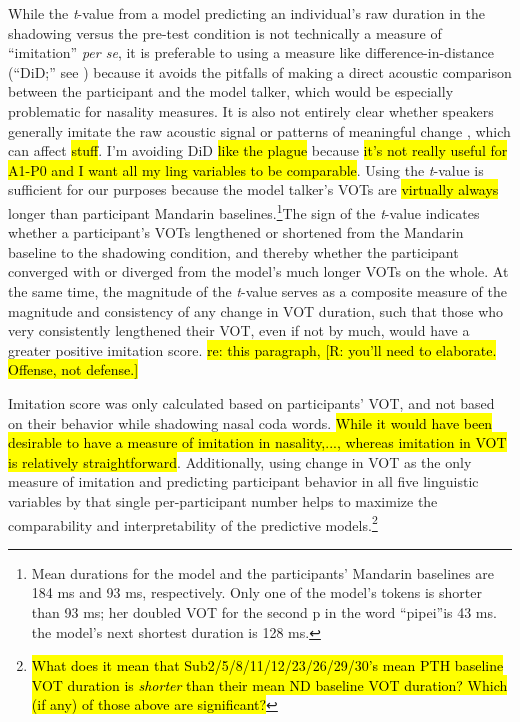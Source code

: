 While the \textit{t}-value from a model predicting an individual's raw duration in the shadowing versus the pre-test condition is not technically a measure of ``imitation'' \textit{per se}, it is preferable to using a measure like difference-in-distance (``DiD;'' see \citealp{babel2010dialect,babel2012evidence}) because it avoids the pitfalls of making a direct acoustic comparison between the participant and the model talker, which would be especially problematic for nasality measures. It is also not entirely clear whether speakers generally imitate the raw acoustic signal or patterns of meaningful change \citep{zellou2016phonetic}, which can affect \hl{stuff}. I'm avoiding DiD \hl{like the plague} because \hl{it's not really useful for A1-P0 and I want all my ling variables to be comparable}. Using the \textit{t}-value is sufficient for our purposes because the  model talker's VOTs are \hl{virtually always} longer than participant Mandarin baselines.\footnote{Mean durations for the model and the participants' Mandarin baselines are 184 ms and 93 ms, respectively. Only one of the model's tokens is shorter than 93 ms; her doubled VOT for the second p in the word ``pipei''is 43 ms. the model's next shortest duration is 128 ms.}The sign of the \textit{t}-value indicates whether a participant's VOTs lengthened or shortened from the Mandarin baseline to the shadowing condition, and thereby whether the participant converged with or diverged from the model's much longer VOTs on the whole. At the same time, the magnitude of the \textit{t}-value serves as a composite measure of the magnitude and consistency of any change in VOT duration, such that those who very consistently lengthened their VOT, even if not by much, would have a greater positive imitation score. \hl{re: this paragraph, [R: you'll need to elaborate. Offense, not defense.]}

Imitation score was only calculated based on participants' VOT, and not based on their behavior while shadowing nasal coda words. \hl{While it would have been desirable to have a measure of imitation in nasality,..., whereas imitation in VOT is relatively straightforward}. Additionally, using change in VOT as the only measure of imitation and predicting participant behavior in all five linguistic variables by that single per-participant number helps to maximize the comparability and interpretability of the predictive models.\footnote{\hl{What does it mean that Sub2/5/8/11/12/23/26/29/30's mean PTH baseline VOT duration is \textit{shorter} than their mean ND baseline VOT duration? Which (if any) of those above are significant?}}

